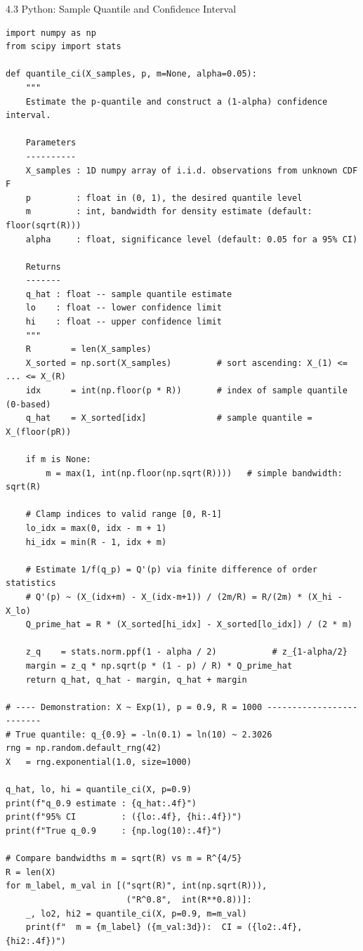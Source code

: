 \documentclass[aspectratio=169,10pt]{beamer}
\begin{document}
\begin{frame}[fragile]{4.3 Python: Sample Quantile and Confidence Interval}
\begin{lstlisting}[style=python]
import numpy as np
from scipy import stats

def quantile_ci(X_samples, p, m=None, alpha=0.05):
    """
    Estimate the p-quantile and construct a (1-alpha) confidence interval.

    Parameters
    ----------
    X_samples : 1D numpy array of i.i.d. observations from unknown CDF F
    p         : float in (0, 1), the desired quantile level
    m         : int, bandwidth for density estimate (default: floor(sqrt(R)))
    alpha     : float, significance level (default: 0.05 for a 95% CI)

    Returns
    -------
    q_hat : float -- sample quantile estimate
    lo    : float -- lower confidence limit
    hi    : float -- upper confidence limit
    """
    R        = len(X_samples)
    X_sorted = np.sort(X_samples)         # sort ascending: X_(1) <= ... <= X_(R)
    idx      = int(np.floor(p * R))       # index of sample quantile (0-based)
    q_hat    = X_sorted[idx]              # sample quantile = X_(floor(pR))

    if m is None:
        m = max(1, int(np.floor(np.sqrt(R))))   # simple bandwidth: sqrt(R)

    # Clamp indices to valid range [0, R-1]
    lo_idx = max(0, idx - m + 1)
    hi_idx = min(R - 1, idx + m)

    # Estimate 1/f(q_p) = Q'(p) via finite difference of order statistics
    # Q'(p) ~ (X_(idx+m) - X_(idx-m+1)) / (2m/R) = R/(2m) * (X_hi - X_lo)
    Q_prime_hat = R * (X_sorted[hi_idx] - X_sorted[lo_idx]) / (2 * m)

    z_q    = stats.norm.ppf(1 - alpha / 2)           # z_{1-alpha/2}
    margin = z_q * np.sqrt(p * (1 - p) / R) * Q_prime_hat
    return q_hat, q_hat - margin, q_hat + margin

# ---- Demonstration: X ~ Exp(1), p = 0.9, R = 1000 -------------------------
# True quantile: q_{0.9} = -ln(0.1) = ln(10) ~ 2.3026
rng = np.random.default_rng(42)
X   = rng.exponential(1.0, size=1000)

q_hat, lo, hi = quantile_ci(X, p=0.9)
print(f"q_0.9 estimate : {q_hat:.4f}")
print(f"95% CI         : ({lo:.4f}, {hi:.4f})")
print(f"True q_0.9     : {np.log(10):.4f}")

# Compare bandwidths m = sqrt(R) vs m = R^{4/5}
R = len(X)
for m_label, m_val in [("sqrt(R)", int(np.sqrt(R))),
                        ("R^0.8",  int(R**0.8))]:
    _, lo2, hi2 = quantile_ci(X, p=0.9, m=m_val)
    print(f"  m = {m_label} ({m_val:3d}):  CI = ({lo2:.4f}, {hi2:.4f})")
\end{lstlisting}
\end{frame}
\end{document}
